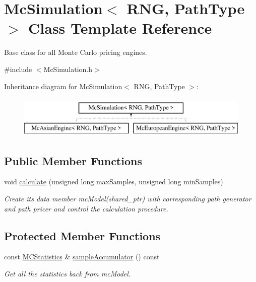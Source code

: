 \hypertarget{class_mc_simulation}{}\section{Mc\+Simulation$<$ R\+NG, Path\+Type $>$ Class Template Reference}
\label{class_mc_simulation}


Base class for all Monte Carlo pricing engines.  




{\ttfamily \#include $<$Mc\+Simulation.\+h$>$}

Inheritance diagram for Mc\+Simulation$<$ R\+NG, Path\+Type $>$\+:\begin{figure}[H]
\begin{center}
\leavevmode
\includegraphics[height=2.000000cm]{class_mc_simulation}
\end{center}
\end{figure}
\subsection*{Public Member Functions}
\begin{DoxyCompactItemize}
\item 
void \hyperlink{class_mc_simulation_a9d323dca5d0a6c50d6fbab6ea564a1f3}{calculate} (unsigned long max\+Samples, unsigned long min\+Samples)
\begin{DoxyCompactList}\small\item\em Create its data member mc\+Model(shared\+\_\+ptr) with corresponding path generator and path pricer and control the calculation procedure. \end{DoxyCompactList}\end{DoxyCompactItemize}
\subsection*{Protected Member Functions}
\begin{DoxyCompactItemize}
\item 
const \hyperlink{class_m_c_statistics}{M\+C\+Statistics} \& \hyperlink{class_mc_simulation_a61ed7348fc9fd05f05ede3c1ef83da16}{sample\+Accumulator} () const
\begin{DoxyCompactList}\small\item\em Get all the statistics back from mc\+Model. \end{DoxyCompactList}\end{DoxyCompactItemize}
